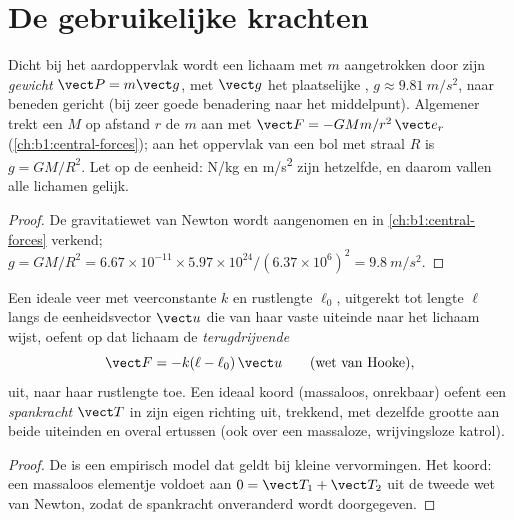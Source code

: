 \section{De gebruikelijke krachten}

\begin{proposition}\label{prop:b1:newton-dynamics:weight}
Dicht bij het aardoppervlak wordt een lichaam met  $m$ aangetrokken door zijn
\emph{gewicht} $\vect P = m\vect g$, met $\vect g$ het plaatselijke ,
$g \approx \qty{9.81}{m/s^2}$, naar beneden gericht (bij zeer goede benadering
naar het middelpunt). Algemener trekt een  $M$ op afstand $r$ de 
$m$ aan met $\vect F = -GMm/r^2\,\vect e_r$ (\cref{ch:b1:central-forces});
aan het oppervlak van een bol met straal $R$ is $g = GM/R^2$. Let op de eenheid:
\unit{N/kg} en \unit{m/s^2} zijn hetzelfde, en daarom vallen alle lichamen
gelijk.
\end{proposition}

\begin{proof}
De gravitatiewet van Newton wordt aangenomen en in
\cref{ch:b1:central-forces} verkend; $g = GM/R^2 = 6.67\times10^{-11} \times
5.97\times10^{24}/(6.37\times10^6)^2 = \qty{9.8}{m/s^2}$.
\end{proof}

\begin{proposition}\label{prop:b1:newton-dynamics:springstring}
Een ideale veer met veerconstante $k$ en rustlengte $\ell_0$, uitgerekt
tot lengte $\ell$ langs de eenheidsvector $\vect u$ die van haar vaste
uiteinde naar het lichaam wijst, oefent op dat lichaam de \emph{terugdrijvende }
\[
\vect F = -k(\ell - \ell_0)\,\vect u \qquad (\text{wet van Hooke}),
\]
uit, naar haar rustlengte toe. Een ideaal koord (massaloos, onrekbaar)
oefent een \emph{spankracht} $\vect T$ in zijn eigen richting uit, trekkend, met dezelfde
grootte aan beide uiteinden en overal ertussen (ook over een massaloze,
wrijvingsloze katrol).
\end{proposition}

\begin{proof}
De  is een empirisch model dat geldt bij kleine vervormingen. Het
koord: een massaloos elementje voldoet aan $0 = \vect T_1 + \vect T_2$ uit de
tweede wet van Newton, zodat de spankracht onveranderd wordt doorgegeven.
\end{proof}

